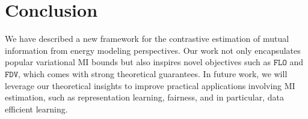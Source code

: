 \documentclass{article}
\theoremstyle{plain}
\theoremstyle{definition}
\theoremstyle{remark}
\newcommand{\FLO}{\texttt{FLO}}
\newcommand{\FDV}{\texttt{FDV}}
\begin{document}
		
		\vspace{-10pt}
		\section{Conclusion}
		\vspace{-8pt}
		
		We have described a new framework for the contrastive estimation of mutual information from energy modeling perspectives. Our work not only encapsulates popular variational MI bounds but also inspires novel objectives such as $\FLO$ and $\FDV$, which comes with strong theoretical guarantees. In future work, we will leverage our theoretical insights to improve practical applications involving MI estimation, such as representation learning, fairness, and in particular, data efficient learning. 
		
		
		\vspace{-8pt}
\end{document}
